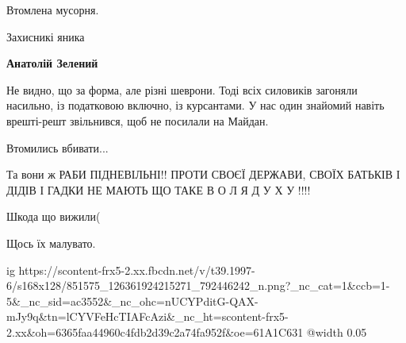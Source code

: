  
 
 
 
 

Втомлена мусорня.

Захисникі яника

\textbf{Анатолій Зелений} 

Не видно, що за форма, але різні шеврони. Тоді всіх силовиків загоняли
насильно, із податковою включно, із курсантами. У нас один знайомий навіть
врешті-решт звільнився, щоб не посилали на Майдан.

Втомились вбивати...

Та вони ж РАБИ ПІДНЕВІЛЬНІ!! ПРОТИ СВОЄЇ ДЕРЖАВИ, СВОЇХ БАТЬКІВ І ДІДІВ І ГАДКИ НЕ МАЮТЬ ЩО ТАКЕ В О Л Я Д У Х У !!!!

Шкода що вижили(

Щось їх малувато.


\ifcmt
  ig https://scontent-frx5-2.xx.fbcdn.net/v/t39.1997-6/s168x128/851575_126361924215271_792446242_n.png?_nc_cat=1&ccb=1-5&_nc_sid=ac3552&_nc_ohc=nUCYPditG-QAX-mJy9q&tn=lCYVFeHcTIAFcAzi&_nc_ht=scontent-frx5-2.xx&oh=6365faa44960c4fdb2d39c2a74fa952f&oe=61A1C631
  @width 0.05
\fi
